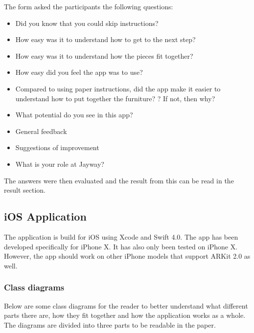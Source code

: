 The form asked the participants the following questions:
\begin{itemize}
\item Did you know that you could skip instructions?
\item How easy was it to understand how to get to the next step?
\item How easy was it to understand how the pieces fit together?
\item How easy did you feel the app was to use?
\item Compared to using paper instructions, did the app make it easier to understand how to put together the furniture? ? If not, then why?
\item What potential do you see in this app?
\item General feedback
\item Suggestions of improvement
\item What is your role at Jayway?
\end{itemize}

The answers were then evaluated and the result from this can be read in the result section.

\subsection{iOS Application}
The application is build for iOS using Xcode and Swift 4.0. The app has been developed specifically for iPhone X. It has also only been tested on iPhone X. However, the app should work on other iPhone models that support ARKit 2.0 as well.

\subsubsection{Class diagrams}
Below are some class diagrams for the reader to better understand what different parts there are, 
how they fit together and how the application works as a whole. The diagrams are divided into 
three parts to be readable in the paper.

